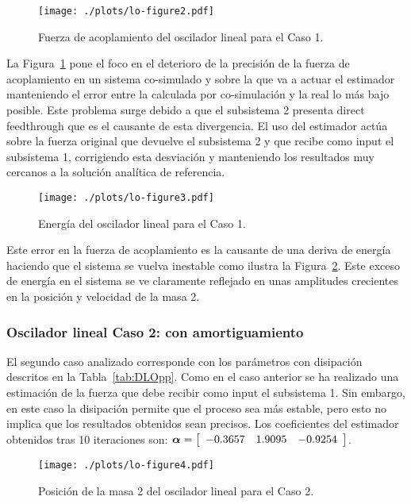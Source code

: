 \begin{figure}[ht!]\centering
	\texttt{[image: ./plots/lo-figure2.pdf]}
	\caption{Fuerza de acoplamiento del oscilador lineal para el Caso 1.}
	\label{fig:OsciladorLinealFor1}
\end{figure}

La Figura~\ref{fig:OsciladorLinealFor1} pone el foco en el deterioro de la precisión de la fuerza de acoplamiento en un sistema co-simulado y sobre la que va a actuar el estimador manteniendo el error entre la calculada por co-simulación y la real lo más bajo posible.
Este problema surge debido a que el subsistema 2 presenta direct feedthrough que es el causante de esta divergencia.
El uso del estimador actúa sobre la fuerza original que devuelve el subsistema 2 y que recibe como input el subsistema 1, corrigiendo esta desviación y manteniendo los resultados muy cercanos a la solución analítica de referencia.

\begin{figure}[ht!]\centering
	\texttt{[image: ./plots/lo-figure3.pdf]}
	\caption{Energía del oscilador lineal para el Caso 1.}
	\label{fig:OsciladorLinealEnergia1}
\end{figure}

Este error en la fuerza de acoplamiento es la causante de una deriva de energía haciendo que el sistema se vuelva inestable como ilustra la Figura~\ref{fig:OsciladorLinealEnergia1}.
Este exceso de energía en el sistema se ve claramente reflejado en unas amplitudes crecientes en la posición y velocidad de la masa 2.


\subsubsection{Oscilador lineal Caso 2: con amortiguamiento}
\label{subsec:res_oscilador2}

El segundo caso analizado corresponde con los parámetros con disipación descritos en la Tabla~\ref{tab:DLOpp}.
Como en el caso anterior se ha realizado una estimación de la fuerza  que debe recibir como input el subsistema 1.
Sin embargo, en este caso la disipación permite que el proceso sea más estable, pero esto no implica que los resultados obtenidos sean precisos.
Los coeficientes del estimador obtenidos tras 10 iteraciones son:
$\coefficients = \sqbr{\matr{ccc}{-0.3657 & 1.9095 & -0.9254}}$.

\begin{figure}[ht!]\centering
	\texttt{[image: ./plots/lo-figure4.pdf]}
	\caption{Posición de la masa 2 del oscilador lineal para el Caso 2.}
	\label{fig:OsciladorLinealPos2}
\end{figure}

